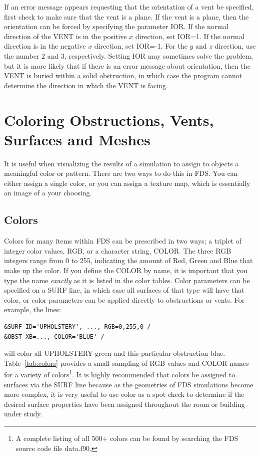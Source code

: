 \documentclass[11pt]{book}
\begin{document}
If an error message appears requesting that
the orientation of a vent be specified, first check to make sure that the vent is a plane.
If the vent is a plane, then the orientation can be forced by specifying the parameter {\ct IOR}.
If the normal direction of the {\ct VENT} is in the positive $x$ direction, set {\ct IOR=1}.
If the normal direction is in the negative $x$ direction, set {\ct IOR=-1}. For the $y$ and
$z$ direction, use the number 2 and 3, respectively. Setting {\ct IOR} may sometimes solve
the problem, but it is more likely that if there is an error message about orientation, then
the {\ct VENT} is buried within a solid obstruction, in which case the program cannot determine
the direction in which the {\ct VENT} is facing.



\section{Coloring Obstructions, Vents, Surfaces and Meshes}
\label{info:colors}

It is useful when visualizing the results of a simulation to assign to objects a meaningful color or pattern. There are two ways to do this in FDS. You can either assign a single color, or you can assign a texture map, which is essentially an image of a your choosing.

\subsection{Colors}

Colors for many items within FDS can be prescribed in two ways; a triplet of integer color values, {\ct RGB}, or a character string, {\ct COLOR}. The three {\ct RGB} integers range from 0 to 255, indicating the amount of Red, Green and Blue that make up the color. If you define the {\ct COLOR} by name, it is important that you type the name {\em exactly} as it is listed in the color tables. Color parameters can be specified on a {\ct SURF} line, in which case all surfaces of that type will have that color, or color parameters can be applied directly to obstructions or vents. For example, the lines:
\begin{lstlisting}
&SURF ID='UPHOLSTERY', ..., RGB=0,255,0 /
&OBST XB=..., COLOR='BLUE' /
\end{lstlisting}
will color all {\ct UPHOLSTERY} green and this particular obstruction blue. Table~\ref{tab:colors} provides a small sampling of {\ct RGB} values and {\ct COLOR} names for a variety of colors\footnote{A complete listing of all 500+ colors can be found by searching the FDS source code file {\ct data.f90}.}.
It is highly recommended that colors be assigned to surfaces via the {\ct SURF} line because as the geometries of FDS simulations become more complex, it is very useful to use color as a spot check to determine if the desired surface properties have been assigned throughout the room or building under study.
\end{document}
